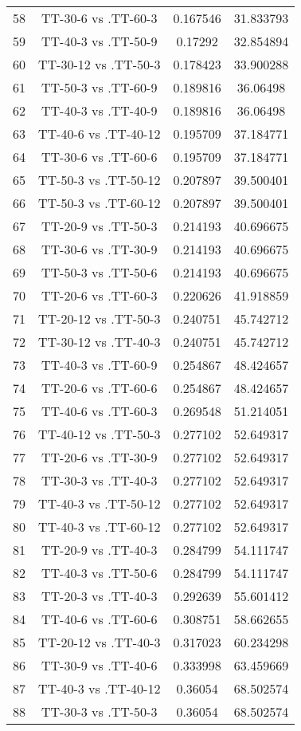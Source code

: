 \documentclass[a4paper,10pt]{article}
\begin{document}
\begin{landscape}
\begin{table}[!htp]
\begin{tabular}{cccc}
58&TT-30-6 vs .TT-60-3&0.167546&31.833793\\
59&TT-40-3 vs .TT-50-9&0.17292&32.854894\\
60&TT-30-12 vs .TT-50-3&0.178423&33.900288\\
61&TT-50-3 vs .TT-60-9&0.189816&36.06498\\
62&TT-40-3 vs .TT-40-9&0.189816&36.06498\\
63&TT-40-6 vs .TT-40-12&0.195709&37.184771\\
64&TT-30-6 vs .TT-60-6&0.195709&37.184771\\
65&TT-50-3 vs .TT-50-12&0.207897&39.500401\\
66&TT-50-3 vs .TT-60-12&0.207897&39.500401\\
67&TT-20-9 vs .TT-50-3&0.214193&40.696675\\
68&TT-30-6 vs .TT-30-9&0.214193&40.696675\\
69&TT-50-3 vs .TT-50-6&0.214193&40.696675\\
70&TT-20-6 vs .TT-60-3&0.220626&41.918859\\
71&TT-20-12 vs .TT-50-3&0.240751&45.742712\\
72&TT-30-12 vs .TT-40-3&0.240751&45.742712\\
73&TT-40-3 vs .TT-60-9&0.254867&48.424657\\
74&TT-20-6 vs .TT-60-6&0.254867&48.424657\\
75&TT-40-6 vs .TT-60-3&0.269548&51.214051\\
76&TT-40-12 vs .TT-50-3&0.277102&52.649317\\
77&TT-20-6 vs .TT-30-9&0.277102&52.649317\\
78&TT-30-3 vs .TT-40-3&0.277102&52.649317\\
79&TT-40-3 vs .TT-50-12&0.277102&52.649317\\
80&TT-40-3 vs .TT-60-12&0.277102&52.649317\\
81&TT-20-9 vs .TT-40-3&0.284799&54.111747\\
82&TT-40-3 vs .TT-50-6&0.284799&54.111747\\
83&TT-20-3 vs .TT-40-3&0.292639&55.601412\\
84&TT-40-6 vs .TT-60-6&0.308751&58.662655\\
85&TT-20-12 vs .TT-40-3&0.317023&60.234298\\
86&TT-30-9 vs .TT-40-6&0.333998&63.459669\\
87&TT-40-3 vs .TT-40-12&0.36054&68.502574\\
88&TT-30-3 vs .TT-50-3&0.36054&68.502574\\

\end{tabular}
\end{table}
\end{landscape}
\end{document}
